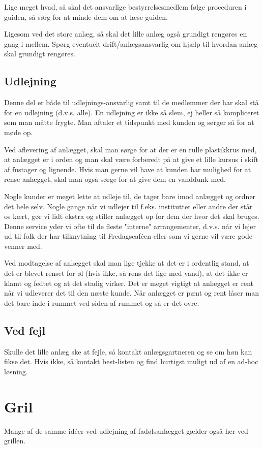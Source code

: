 Lige meget hvad, så skal det ansvarlige bestyrrelsesmedlem følge proceduren i guiden, så sørg for at minde dem om at læse guiden.


Ligesom ved det store anlæg, så skal det lille anlæg også grundigt rengøres en gang i mellem. Spørg eventuelt drift/anlægsansvarlig om hjælp til hvordan anlæg skal grundigt rengøres.

\subsection{Udlejning}
Denne del er både til udlejnings-ansvarlig samt til de medlemmer der har skal stå for en udlejning (d.v.s. alle). En udlejning er ikke så slem, ej heller så kompliceret som man måtte frygte. Man aftaler et tidspunkt med kunden og sørger så for at møde op.

Ved aflevering af anlægget, skal man sørge for at der er en rulle plastikkrus med, at anlægget er i orden og man skal være forberedt på at give et lille kursus i skift af fustager og lignende. Hvis man gerne vil have at kunden har mulighed for at rense anlægget, skal man også sørge for at give dem en vanddunk med.

Nogle kunder er meget lette at udleje til, de tager bare imod anlægget og ordner det hele selv. Nogle gange når vi udlejer til f.eks. instituttet eller andre der står os kært, gør vi lidt ekstra og stiller anlægget op for dem der hvor det skal bruges. Denne service yder vi ofte til de fleste "interne" arrangementer, d.v.s. når vi lejer ud til folk der har tilknytning til Fredagscaféen eller som vi gerne vil være gode venner med.

Ved modtagelse af anlægget skal man lige tjekke at det er i ordentlig stand, at det er blevet renset for øl (hvis ikke, så rens det lige med vand), at det ikke er klamt og fedtet og at det stadig virker. Det er meget vigtigt at anlægget er rent når vi udleverer det til den næste kunde. Når anlægget er pænt og rent låser man det bare inde i rummet ved siden af rummet og så er det ovre.
\subsection{Ved fejl}
Skulle det lille anlæg ske at fejle, så kontakt anlægsgartneren og se om høn kan fikse det. Hvis ikke, så kontakt best-listen og find hurtigst muligt ud af en ad-hoc løsning.

\section{Gril}
Mange af de samme idéer ved udlejning af fadølsanlægget gælder også her ved grillen.

